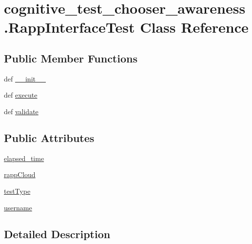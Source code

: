 \hypertarget{classcognitive__test__chooser__awareness_1_1RappInterfaceTest}{\section{cognitive\-\_\-test\-\_\-chooser\-\_\-awareness.\-Rapp\-Interface\-Test Class Reference}
\label{classcognitive__test__chooser__awareness_1_1RappInterfaceTest}
}
\subsection*{Public Member Functions}
\begin{DoxyCompactItemize}
\item 
def \hyperlink{classcognitive__test__chooser__awareness_1_1RappInterfaceTest_a30e3bcdb3f802d3ed18e991b3f7685bf}{\-\_\-\-\_\-init\-\_\-\-\_\-}
\item 
def \hyperlink{classcognitive__test__chooser__awareness_1_1RappInterfaceTest_a05d6f6a564d54a973ea3cfe0124f7e6f}{execute}
\item 
def \hyperlink{classcognitive__test__chooser__awareness_1_1RappInterfaceTest_a63677384d68890eac5d98765cb07a1f0}{validate}
\end{DoxyCompactItemize}
\subsection*{Public Attributes}
\begin{DoxyCompactItemize}
\item 
\hyperlink{classcognitive__test__chooser__awareness_1_1RappInterfaceTest_a521634940774d44702e13be2f0fdc602}{elapsed\-\_\-time}
\item 
\hyperlink{classcognitive__test__chooser__awareness_1_1RappInterfaceTest_a5b0aa2824239f9416534995c4e244ba3}{rapp\-Cloud}
\item 
\hyperlink{classcognitive__test__chooser__awareness_1_1RappInterfaceTest_afc7aa69faa3db55a1250ae1af4b21efd}{test\-Type}
\item 
\hyperlink{classcognitive__test__chooser__awareness_1_1RappInterfaceTest_a0bf67b2e3c3f7abd9da0c5e3e68ca67c}{username}
\end{DoxyCompactItemize}


\subsection{Detailed Description}



